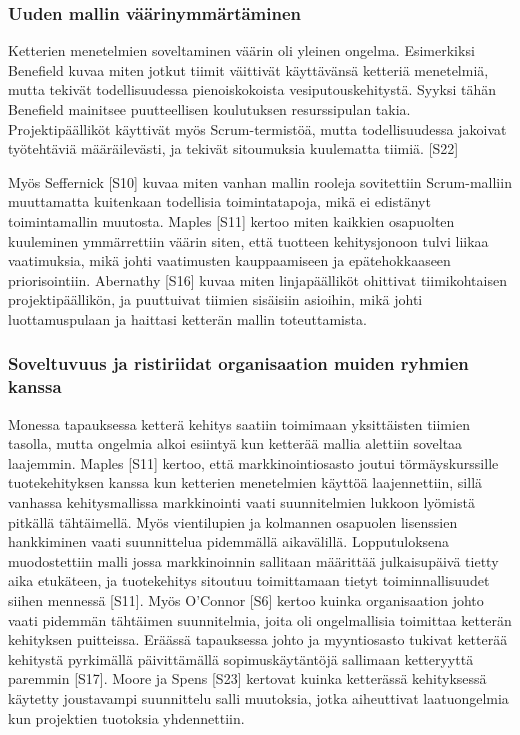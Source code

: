 \subsubsection{Uuden mallin väärinymmärtäminen}

Ketterien menetelmien soveltaminen väärin oli yleinen ongelma. Esimerkiksi
Benefield kuvaa miten jotkut tiimit väittivät käyttävänsä ketteriä menetelmiä,
mutta tekivät todellisuudessa pienoiskokoista vesiputouskehitystä. Syyksi tähän
Benefield mainitsee puutteellisen koulutuksen resurssipulan takia.
Projektipäälliköt käyttivät myös Scrum-termistöä, mutta todellisuudessa jakoivat
työtehtäviä määräilevästi, ja tekivät sitoumuksia kuulematta tiimiä. [S22]

Myös Seffernick [S10] kuvaa miten vanhan mallin rooleja sovitettiin
Scrum-malliin muuttamatta kuitenkaan todellisia toimintatapoja, mikä ei
edistänyt toimintamallin muutosta. Maples [S11] kertoo miten kaikkien osapuolten
kuuleminen ymmärrettiin väärin siten, että tuotteen kehitysjonoon tulvi liikaa
vaatimuksia, mikä johti vaatimusten kauppaamiseen ja epätehokkaaseen
priorisointiin. Abernathy [S16] kuvaa miten linjapäälliköt ohittivat
tiimikohtaisen projektipäällikön, ja puuttuivat tiimien sisäisiin asioihin,
mikä johti luottamuspulaan ja haittasi ketterän mallin toteuttamista.

\subsubsection{Soveltuvuus ja ristiriidat organisaation muiden ryhmien kanssa}

Monessa tapauksessa ketterä kehitys saatiin toimimaan yksittäisten tiimien
tasolla, mutta ongelmia alkoi esiintyä kun ketterää mallia alettiin soveltaa
laajemmin. Maples [S11] kertoo, että markkinointiosasto joutui törmäyskurssille
tuotekehityksen kanssa kun ketterien menetelmien käyttöä laajennettiin, sillä
vanhassa kehitysmallissa markkinointi vaati suunnitelmien lukkoon lyömistä
pitkällä tähtäimellä. Myös vientilupien ja kolmannen osapuolen lisenssien
hankkiminen vaati suunnittelua pidemmällä aikavälillä. Lopputuloksena
muodostettiin malli jossa markkinoinnin sallitaan määrittää julkaisupäivä tietty
aika etukäteen, ja tuotekehitys sitoutuu toimittamaan tietyt toiminnallisuudet
siihen mennessä [S11]. Myös O'Connor [S6] kertoo kuinka organisaation johto
vaati pidemmän tähtäimen suunnitelmia, joita oli ongelmallisia toimittaa
ketterän kehityksen puitteissa. Eräässä tapauksessa johto ja myyntiosasto
tukivat ketterää kehitystä pyrkimällä päivittämällä sopimuskäytäntöjä sallimaan
ketteryyttä paremmin [S17]. Moore ja Spens [S23] kertovat kuinka ketterässä
kehityksessä käytetty joustavampi suunnittelu salli muutoksia, jotka aiheuttivat
laatuongelmia kun projektien tuotoksia yhdennettiin.

